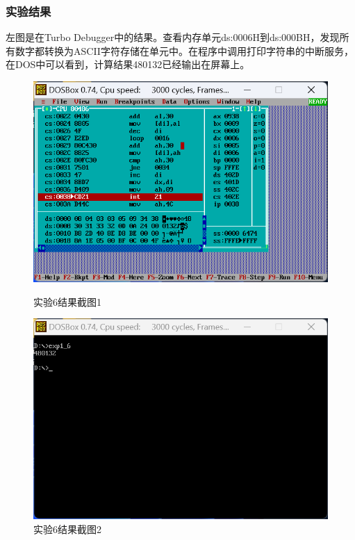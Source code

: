 \documentclass[12pt, a4paper, oneside]{ctexart}
\begin{document}
\subsubsection{实验结果}
左图是在Turbo Debugger中的结果。查看内存单元ds:0006H到ds:000BH，发现所有数字都转换为ASCII字符存储在单元中。在程序中调用打印字符串的中断服务，在DOS中可以看到，计算结果480132已经输出在屏幕上。
\begin{figure}[H]
    \centering
    \begin{minipage}{0.45\textwidth}
    \centering
    \includegraphics[scale=0.35]{pic/exp1_6_1.png}
    \caption{实验6结果截图1}
    \end{minipage}
    \hspace{0.05\textwidth}
    \begin{minipage}{0.45\textwidth}
    \centering
    \includegraphics[scale=0.35]{pic/exp1_6_2.png}
    \caption{实验6结果截图2}
    \end{minipage}
\end{figure}
\end{document}
